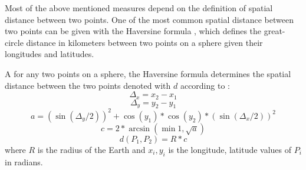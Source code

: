 Most of the above mentioned measures depend on the definition of spatial distance between two points. One of the most common spatial distance between two points can be given with the Haversine formula \cite{haversine}, which  defines the great-circle distance in kilometers between two points on a sphere given their longitudes and latitudes.

\begin{definition}
A for any two points on a sphere, the Haversine formula determines the spatial distance between the two points denoted with $d$ according to \cite{haversine}:
    \[\Delta_{x} = x_{2} - x_{1}\]
    \[\Delta_{y} = y_{2} - y_{1}\]
    \[a = (\sin(\Delta_{y}/2))^2 + \cos{(y_{1})} * \cos{(y_{2})} * (\sin{(\Delta_{x}/2)})^2 \]
    \[c = 2 * \arcsin{(\min{1,\sqrt{a}})}\]
    \[d(P_{1}, P_{2}) = R * c\]
    where $R$ is the radius of the Earth and $x_{i}, y_{i}$ is the longitude, latitude values of $P_{i}$ in radians.
\end{definition}

